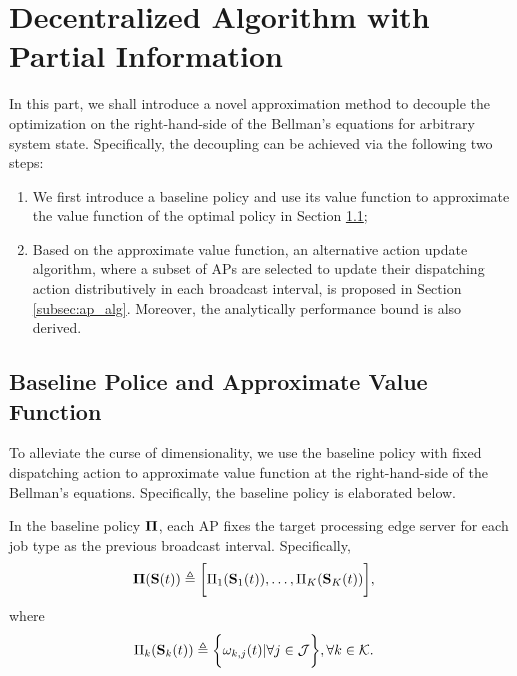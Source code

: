 \section{Decentralized Algorithm with Partial Information}
\label{sec:algorithm}

In this part, we shall introduce a novel approximation method to decouple the optimization on the right-hand-side of the Bellman's equations for arbitrary system state.
Specifically, the decoupling can be achieved via the following two steps:
\begin{enumerate}
    \item We first introduce a baseline policy and use its value function to approximate the value function of the optimal policy in Section \ref{subsec:baseline};
    \item Based on the approximate value function, an alternative action update algorithm, where a subset of APs are selected to update their dispatching action distributively in each broadcast interval, is proposed in Section \ref{subsec:ap_alg}.
    Moreover, the analytically performance bound is also derived.
\end{enumerate}

\subsection{Baseline Police and Approximate Value Function}
\label{subsec:baseline}
To alleviate the curse of dimensionality, we use the baseline policy with fixed dispatching action to approximate value function at the right-hand-side of the Bellman's equations.
Specifically, the baseline policy is elaborated below.

\begin{policy}
    In the baseline policy $\boldsymbol{\Pi}$, each AP fixes the target processing edge server for each job type as the previous broadcast interval. Specifically,
    \begin{align}
        \boldsymbol{\Pi}(\mathbf{S}(t)) &\triangleq \bigg[ \Pi_{1}(\mathbf{S}_{1}(t)), \dots, \Pi_{K}(\mathbf{S}_{K}(t)) \bigg],
    \end{align}
    where 
    \begin{align}
        \Pi_{k}(\mathbf{S}_{k}(t)) &\triangleq \bigg\{
            \omega_{k,j}(t) | \forall j\in\mathcal{J}
        \bigg\}, \forall k\in\mathcal{K}.
    \end{align}
\end{policy}

